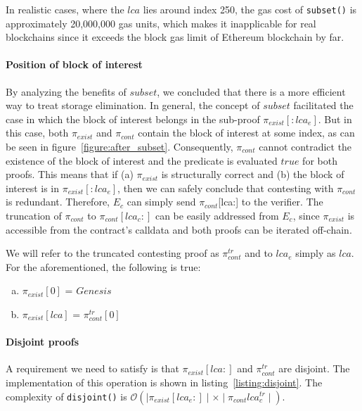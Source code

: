 In realistic cases, where the $lca$ lies around index 250, the gas cost of
\texttt{subset()} is approximately 20,000,000 gas units, which makes it
inapplicable for real blockchains since it exceeds the block gas limit of Ethereum
blockchain by far.
\paragraph{Position of block of interest} By analyzing the benefits of
$subset$, we concluded that there is a more efficient way to treat storage
elimination. In general, the concept of $subset$ facilitated the case in which
the block of interest belongs in the sub-proof $\pi_{exist}[:lca_{e}]$. But in
this case, both $\pi_{exist}$ and $\pi_{cont}$ contain the block of interest at
some index, as can be seen in figure~\ref{figure:after_subset}. Consequently,
$\pi_{cont}$ cannot contradict the existence of the block of interest and the
predicate is evaluated $true$ for both proofs. This means that if (a)
$\pi_{exist}$ is structurally correct and (b) the block of interest is in
$\pi_{exist}[:lca_{e}]$, then we can safely conclude that contesting with
$\pi_{cont}$ is redundant. Therefore, $E_{c}$ can simply send
$\pi_{cont}$[lca:] to the verifier. The truncation of $\pi_{cont}$ to
$\pi_{cont}[lca_{c}:]$ can be easily addressed from $E_{c}$, since
$\pi_{exist}$ is accessible from the contract's calldata and both proofs can be
iterated off-chain.

We will refer to the truncated contesting proof as $\pi_{cont}^{tr}$ and to
$lca_{e}$ simply as $lca$. For the aforementioned, the following is true:
\begin{enumerate}[(a)]
    \item  $\pi_{exist}[0]$ = $Genesis$
    \item  $\pi_{exist}[lca]$ = $\pi_{cont}^{tr}[0]$
\end{enumerate}

\newcommand*{\exist}{$\pi_{exist}$}
\newcommand*{\cont}{$\pi_{cont}^{tr}$}

\paragraph{Disjoint proofs} A requirement we need to satisfy is that
$\pi_{exist}[lca:]$ and $\pi_{cont}^{tr}$ are disjoint. The implementation of
this operation is shown in listing~\ref{listing:disjoint}. The complexity of
\texttt{disjoint()} is $\mathcal{O}(\mid\pi_{exist}[lca_{e}:]\mid \times
\mid\pi_{cont}lca_{c}^{tr}\mid)$.

